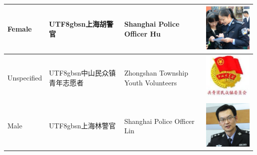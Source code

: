 \documentclass[11pt]{article}
\newcommand{\zh}[1]{\begin{CJK*}{UTF8}{gbsn}#1\end{CJK*}}
\begin{document}
\begin{table}[H]
\begin{tabular}{|p{}|p{}|p{}|p{}|}
	Female & \zh{上海胡警官} & Shanghai Police Officer Hu & \begin{minipage}{.2\textwidth}\includegraphics[width=.5\linewidth, height=.5\linewidth]{figures/govt_avatars/4.jpg}\end{minipage} \\ \hline
	Unspecified & \zh{中山民众镇青年志愿者} & Zhongshan Township Youth Volunteers & \begin{minipage}{.2\textwidth}\includegraphics[width=.5\linewidth, height=.5\linewidth]{figures/govt_avatars/5.jpg}\end{minipage} \\ \hline
	Male & \zh{上海林警官} & Shanghai Police Officer Lin & \begin{minipage}{.2\textwidth}\includegraphics[width=.5\linewidth, height=.5\linewidth]{figures/govt_avatars/6.jpg}\end{minipage} \\ \hline
  \end{tabular}
  \label{uidgov}
\end{table}
\end{document}
